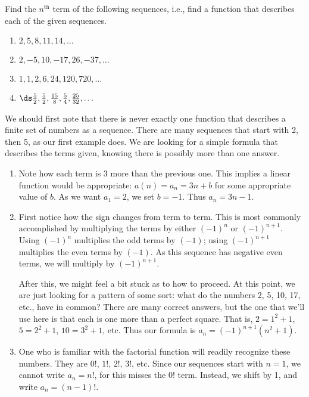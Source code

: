 \begin{example}\label{ex_seq2}%
Find the $n^\text{th}$ term of the following sequences, i.e., find a function that describes each of the given sequences.
\begin{multicols}{2}
\begin{enumerate}
\item		$2, 5, 8, 11, 14, \dotsc$
\item		$2, -5, 10, -17, 26, -37, \dotsc$
\item		$1, 1, 2, 6, 24, 120, 720, \dotsc$
\item		$\ds \frac52, \frac52, \frac{15}8, \frac54, \frac{25}{32}, \dotsc$
\end{enumerate}
\end{multicols}
\solution
We should first note that there is never exactly one function that describes a finite set of numbers as a sequence. There are many sequences that start with 2, then 5, as our first example does. We are looking for a simple formula that describes the terms given, knowing there is possibly more than one answer.
\begin{enumerate}
\item		Note how each term is 3 more than the previous one. This implies a linear function would be appropriate: $a(n) = a_n = 3n + b$ for some appropriate value of $b$. As we want $a_1=2$, we set $b=-1$. Thus $a_n = 3n-1$.

\item		First notice how the sign changes from term to term. This is most commonly accomplished by multiplying the terms by either $(-1)^n$ or $(-1)^{n+1}$. Using $(-1)^n$ multiplies the odd terms by $(-1)$; using $(-1)^{n+1}$ multiplies the even terms by $(-1)$. As this sequence has negative even terms, we will multiply by $(-1)^{n+1}$. 

After this, we might feel a bit stuck as to how to proceed. At this point, we are just looking for a pattern of some sort: what do the numbers 2, 5, 10, 17, etc., have in common? There are many correct answers, but the one that we'll use here is that each is one more than a perfect square. That is, $2=1^2+1$, $5=2^2+1$, $10=3^2+1$, etc. Thus our formula is $a_n= (-1)^{n+1}(n^2+1)$.

\item		One who is familiar with the factorial function will readily recognize these numbers. They are $0!$, $1!$, $2!$, $3!$, etc. Since our sequences start with $n=1$, we cannot write $a_n = n!$, for this misses the $0!$ term. Instead, we shift by 1, and write $a_n = (n-1)!$.


\end{enumerate}
\end{example}
